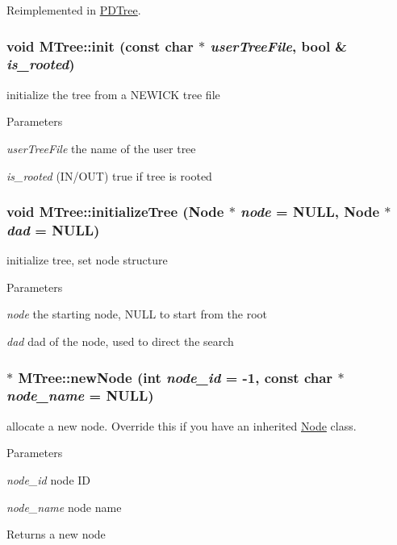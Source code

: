 Reimplemented in \hyperlink{classPDTree_a423ef933e7940c5c745e27898a394bfc}{PDTree}.\hypertarget{classMTree_a055e39797764c95c56dadd039eb4d00e}{
\subsubsection[{init}]{\setlength{\rightskip}{0pt plus 5cm}void MTree::init (const char $\ast$ {\em userTreeFile}, \/  bool \& {\em is\_\-rooted})}}
\label{classMTree_a055e39797764c95c56dadd039eb4d00e}
initialize the tree from a NEWICK tree file 
\begin{DoxyParams}{Parameters}
\item[{\em userTreeFile}]the name of the user tree \item[{\em is\_\-rooted}](IN/OUT) true if tree is rooted \end{DoxyParams}
\hypertarget{classMTree_ad856b7db2e4871e455e1e69c4d5767ae}{
\subsubsection[{initializeTree}]{\setlength{\rightskip}{0pt plus 5cm}void MTree::initializeTree ({\bf Node} $\ast$ {\em node} = {\ttfamily NULL}, \/  {\bf Node} $\ast$ {\em dad} = {\ttfamily NULL})}}
\label{classMTree_ad856b7db2e4871e455e1e69c4d5767ae}
initialize tree, set node structure 
\begin{DoxyParams}{Parameters}
\item[{\em node}]the starting node, NULL to start from the root \item[{\em dad}]dad of the node, used to direct the search \end{DoxyParams}
\hypertarget{classMTree_a5e9560ad6b544027bea362387eb2ec3f}{
\subsubsection[{newNode}]{ $\ast$ MTree::newNode (int {\em node\_\-id} = {\ttfamily -\/1}, \/  const char $\ast$ {\em node\_\-name} = {\ttfamily NULL})}}
\label{classMTree_a5e9560ad6b544027bea362387eb2ec3f}
allocate a new node. Override this if you have an inherited \hyperlink{classNode}{Node} class. 
\begin{DoxyParams}{Parameters}
\item[{\em node\_\-id}]node ID \item[{\em node\_\-name}]node name \end{DoxyParams}
\begin{DoxyReturn}{Returns}
a new node 
\end{DoxyReturn}


